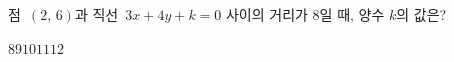 점~$(2,\,6)$과 직선~$3x+4y+k=0$ 사이의 거리가 $8$일 때, 양수 $k$의 값은?
\begin{choices32}{$8$}{$9$}{$10$}{$11$}{$12$}\end{choices32}
